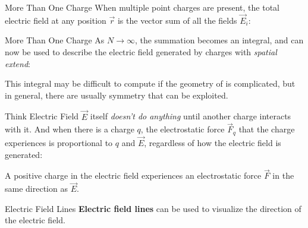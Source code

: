 \documentclass[12pt,aspectratio=169]{beamer}
\begin{document}
\begin{frame}{More Than One Charge}
  When multiple point charges are present, the total electric field at any
  position $\vec r$ is the vector sum of all the fields $\vec E_i$:
    
\end{frame}



\begin{frame}{More Than One Charge}
  As $N\rightarrow\infty$, the summation becomes an integral, and can now be
  used to describe the electric field generated by charges with
  \emph{spatial extend}:

  
  This integral may be difficult to compute if the geometry of is complicated,
  but in general, there are usually symmetry that can be exploited.
\end{frame}



\begin{frame}{Think Electric Field}
  $\vec E$ itself \emph{doesn't do anything} until another charge interacts with
  it. And when there is a charge $q$, the electrostatic force $\vec F_q$ that
  the charge experiences is proportional to $q$ and $\vec E$, regardless of how
  the electric field is generated:


  A positive charge in the electric field experiences an electrostatic force
  $\vec F$ in the same direction as $\vec E$.
\end{frame}



\begin{frame}{Electric Field Lines}
  \textbf{Electric field lines} can be used to visualize the direction of the
  electric field.
  \begin{center}
    \hspace{.2in}
  \end{center}
\end{frame}
\end{document}
